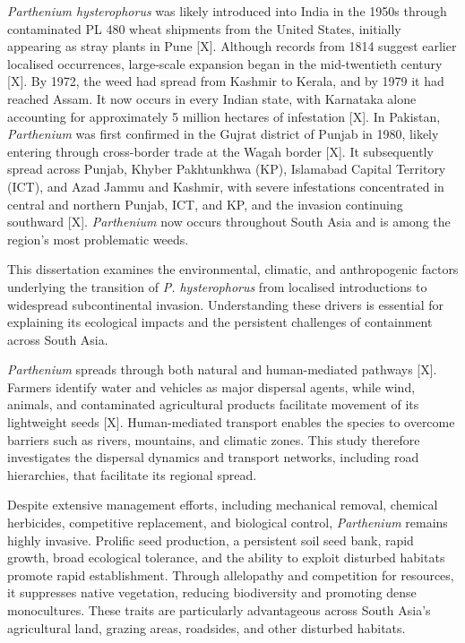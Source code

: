 \textit{Parthenium hysterophorus} was likely introduced into India in the 1950s through contaminated PL 480 wheat shipments from the United States, initially appearing as stray plants in Pune [X]. Although records from 1814 suggest earlier localised occurrences, large-scale expansion began in the mid-twentieth century [X]. By 1972, the weed had spread from Kashmir to Kerala, and by 1979 it had reached Assam. It now occurs in every Indian state, with Karnataka alone accounting for approximately 5 million hectares of infestation [X]. In Pakistan, \textit{Parthenium} was first confirmed in the Gujrat district of Punjab in 1980, likely entering through cross-border trade at the Wagah border [X]. It subsequently spread across Punjab, Khyber Pakhtunkhwa (KP), Islamabad Capital Territory (ICT), and Azad Jammu and Kashmir, with severe infestations concentrated in central and northern Punjab, ICT, and KP, and the invasion continuing southward [X]. \textit{Parthenium} now occurs throughout South Asia and is among the region's most problematic weeds.

This dissertation examines the environmental, climatic, and anthropogenic factors underlying the transition of \textit{P. hysterophorus} from localised introductions to widespread subcontinental invasion. Understanding these drivers is essential for explaining its ecological impacts and the persistent challenges of containment across South Asia.

\textit{Parthenium} spreads through both natural and human-mediated pathways [X]. Farmers identify water and vehicles as major dispersal agents, while wind, animals, and contaminated agricultural products facilitate movement of its lightweight seeds [X]. Human-mediated transport enables the species to overcome barriers such as rivers, mountains, and climatic zones. This study therefore investigates the dispersal dynamics and transport networks, including road hierarchies, that facilitate its regional spread.

Despite extensive management efforts, including mechanical removal, chemical herbicides, competitive replacement, and biological control, \textit{Parthenium} remains highly invasive. Prolific seed production, a persistent soil seed bank, rapid growth, broad ecological tolerance, and the ability to exploit disturbed habitats promote rapid establishment. Through allelopathy and competition for resources, it suppresses native vegetation, reducing biodiversity and promoting dense monocultures. These traits are particularly advantageous across South Asia's agricultural land, grazing areas, roadsides, and other disturbed habitats.

